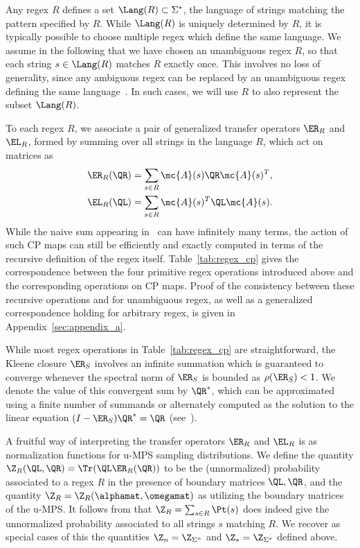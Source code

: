 Any regex $R$ defines a set $\Lang(R) \subset \Sigma^*$, the language of strings matching the pattern specified by $R$. While $\Lang(R)$ is uniquely determined by $R$, it is typically possible to choose multiple regex which define the same language. We assume in the following that we have chosen an unambiguous regex $R$, so that each string $s \in \Lang(R)$ matches $R$ exactly once. This involves no loss of generality, since any ambiguous regex can be replaced by an unambiguous regex defining the same language~\citep{book1971}. In such cases, we will use $R$ to also represent the subset $\Lang(R)$.

To each regex $R$, we associate a pair of generalized transfer operators $\ER_{R}$ and $\EL_{R}$, formed by summing over all strings in the language $R$, which act on matrices as
%
\begin{align}
\label{eq:transfer_op}
\ER_R(\QR) &= \sum_{s\in R} \mc{A}(s) \QR \mc{A}(s)^T, \nonumber\\ 
\EL_R(\QL) &= \sum_{s\in R} \mc{A}(s)^T \QL \mc{A}(s).
\end{align}
%
While the naive sum appearing in~ can have infinitely many terms, the action of such CP maps can still be efficiently and exactly computed in terms of the recursive definition of the regex itself. Table~\ref{tab:regex_cp} gives the correspondence between the four primitive regex operations introduced above and the corresponding operations on CP maps. Proof of the consistency between these recursive operations and  for unambiguous regex, as well as a generalized correspondence holding for arbitrary regex, is given in Appendix~\ref{sec:appendix_a}.

While most regex operations in Table~\ref{tab:regex_cp} are straightforward, the Kleene closure $\ER_S$ involves an infinite summation which is guaranteed to converge whenever the spectral norm of $\ER_S$ is bounded as $\rho(\ER_S) < 1$. We denote the value of this convergent sum by $\QR^*$, which can be approximated using a finite number of summands or alternately computed as the solution to the linear equation $(I - \ER_S)\QR^* = \QR$ (see~\citep{balle2019}).

A fruitful way of interpreting the transfer operators $\ER_R$ and $\EL_R$ is as normalization functions for u-MPS sampling distributions. We define the quantity $\Z_R(\QL, \QR) = \Tr(\QL \ER_R(\QR))$ to be the (unnormalized) probability associated to a regex $R$ in the presence of boundary matrices $\QL, \QR$, and the quantity $\Z_R = \Z_R(\alphamat, \omegamat)$ as utilizing the boundary matrices of the u-MPS. It follows from  that $\Z_R = \sum_{s \in R}\Pt(s)$ does indeed give the unnormalized probability associated to all strings $s$ matching $R$. We recover as special cases of this the quantities $\Z_n = \Z_{\Sigma^n}$ and $\Z_* = \Z_{\Sigma^*}$ defined above.


